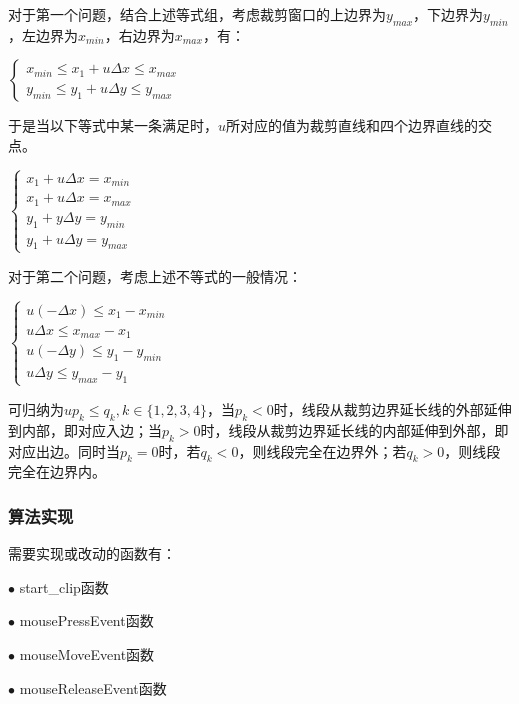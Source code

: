 \documentclass[a4paper,UTF8]{article}
\theoremstyle{definition}
\begin{document}
对于第一个问题，结合上述等式组，考虑裁剪窗口的上边界为$y_{max}$，下边界为$y_{min}$，左边界为$x_{min}$，右边界为$x_{max}$，有：

\begin{center}
	$
	\begin{cases}  
		x_{min}\leq x_1 + u\Delta x\leq x_{max} \\
		y_{min}\leq y_1 + u\Delta y\leq y_{max}
	\end{cases} 
	$
\end{center}

于是当以下等式中某一条满足时，$u$所对应的值为裁剪直线和四个边界直线的交点。

\begin{center}
	$
	\begin{cases}  
		x_1 + u\Delta x = x_{min}	\\
		x_1 + u\Delta x = x_{max}	\\
		y_1 + y\Delta y = y_{min}	\\
		y_1 + u\Delta y = y_{max}
	\end{cases} 
	$
\end{center}

对于第二个问题，考虑上述不等式的一般情况：

\begin{center}
	$
	\begin{cases}  
		u(-\Delta x)\leq x_1 - x_{min}	\\
		u\Delta x\leq x_{max} - x_1	\\
		u(-\Delta y)\leq y_1-y_{min}	\\
		u\Delta y\leq y_{max} - y_1
	\end{cases} 
	$
\end{center}

可归纳为$up_k\leq q_k,k\in \{1,2,3,4\}$，当$p_k<0$时，线段从裁剪边界延长线的外部延伸到内部，即对应入边；当$p_k>0$时，线段从裁剪边界延长线的内部延伸到外部，即对应出边。同时当$p_k=0$时，若$q_k<0$，则线段完全在边界外；若$q_k>0$，则线段完全在边界内。

\subsubsection{算法实现}

需要实现或改动的函数有：

$\bullet$ start\_clip函数

$\bullet$ mousePressEvent函数

$\bullet$ mouseMoveEvent函数

$\bullet$ mouseReleaseEvent函数
\end{document}
